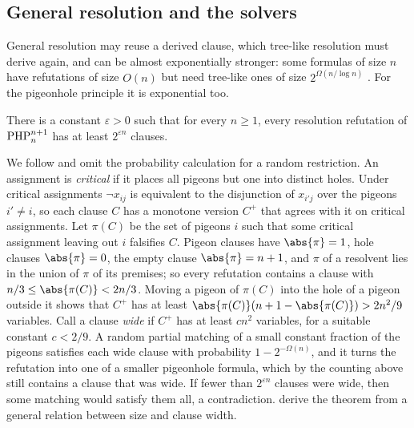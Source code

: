 \begin{refsection}
\subsection{General resolution and the solvers}

General resolution may reuse a derived clause, which tree-like resolution must derive again, and can be almost exponentially stronger: some formulas of size $n$ have refutations of size $O(n)$ but need tree-like ones of size $2^{\Omega(n/\log n)}$ \parencite{BenSassonImpagliazzoWigderson2004}. For the pigeonhole principle it is exponential too.

\begin{theorem}\label{thm:certificates:haken}
There is a constant $\varepsilon>0$ such that for every $n\ge1$, every resolution refutation of $\mathrm{PHP}^{n+1}_{n}$ has at least $2^{\varepsilon n}$ clauses.
\end{theorem}

\begin{proofsketch}
We follow \textcite{BeamePitassi1996} and omit the probability calculation for a random restriction. An assignment is \emph{critical} if it places all pigeons but one into distinct holes. Under critical assignments $\neg x_{ij}$ is equivalent to the disjunction of $x_{i'j}$ over the pigeons $i'\ne i$, so each clause $C$ has a monotone version $C^+$ that agrees with it on critical assignments. Let $\pi(C)$ be the set of pigeons $i$ such that some critical assignment leaving out $i$ falsifies $C$. Pigeon clauses have $\abs{\pi}=1$, hole clauses $\abs{\pi}=0$, the empty clause $\abs{\pi}=n+1$, and $\pi$ of a resolvent lies in the union of $\pi$ of its premises; so every refutation contains a clause with $n/3\le\abs{\pi(C)}<2n/3$. Moving a pigeon of $\pi(C)$ into the hole of a pigeon outside it shows that $C^+$ has at least $\abs{\pi(C)}(n+1-\abs{\pi(C)})>2n^2/9$ variables. Call a clause \emph{wide} if $C^+$ has at least $cn^2$ variables, for a suitable constant $c<2/9$. A random partial matching of a small constant fraction of the pigeons satisfies each wide clause with probability $1-2^{-\Omega(n)}$, and it turns the refutation into one of a smaller pigeonhole formula, which by the counting above still contains a clause that was wide. If fewer than $2^{\varepsilon n}$ clauses were wide, then some matching would satisfy them all, a contradiction. \Textcite{BenSassonWigderson2001} derive the theorem from a general relation between size and clause width.
\end{proofsketch}


\end{refsection}

